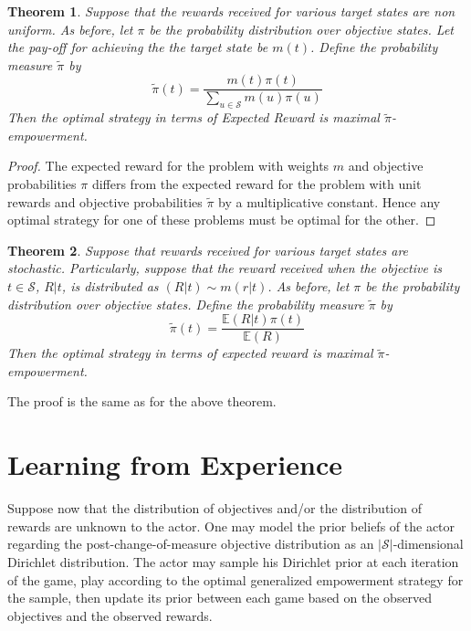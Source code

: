 \documentclass{article}
\newtheorem{theorem}{Theorem}
\newcommand{\EE}{\mathbb{E}}
\newcommand{\Ss}{\mathcal{S}}
\begin{document}
\begin{theorem}
Suppose that the rewards received for various target states are non uniform. As before, let $\pi$ be the probability distribution over objective states. 
Let the pay-off for achieving the the target state be $m(t)$. 
Define the probability measure $\tilde{\pi}$ by
\[\tilde{\pi}(t)=\frac{m(t)\pi(t)}{\sum_{u\in\Ss} m(u)\pi(u)}\] 
Then the optimal strategy in terms of Expected Reward is maximal $\tilde{\pi}$-empowerment. 
\end{theorem}
\begin{proof}
The expected reward for the problem with weights $m$ and objective probabilities $\pi$ differs from the expected reward for the problem with unit rewards and objective probabilities $\tilde{\pi}$ by a multiplicative constant. Hence any optimal strategy for one of these problems must be optimal for the other. 
\end{proof}
\begin{theorem} 
Suppose that rewards received for various target states are stochastic. Particularly, suppose that the reward received when the objective is $t\in\Ss$, $R|t$, is distributed as $(R|t)\sim m(r|t)$. As before, let $\pi$ be the probability distribution over objective states. Define the probability measure $\tilde{\pi}$ by
\[\tilde{\pi}(t)=\frac{\EE(R|t)\pi(t)}{\EE(R)}\] 
Then the optimal strategy in terms of expected reward is maximal $\tilde{\pi}$-empowerment. 
\end{theorem}
The proof is the same as for the above theorem.



\section{Learning from Experience}
Suppose now that the distribution of objectives and/or the distribution of rewards are unknown to the actor. 
One may model the prior beliefs of the actor regarding the post-change-of-measure objective distribution as an $|\Ss|$-dimensional Dirichlet distribution. 
The actor may sample his Dirichlet prior at each iteration of the game, play according to the optimal generalized empowerment strategy for the sample, then update its prior between each game based on the observed objectives and the observed rewards.


\newpage


\end{document}
